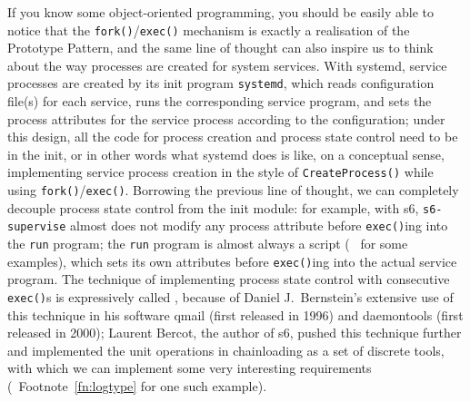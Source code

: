 If you know some object-oriented programming, you should be easily able to
notice that the \verb|fork()|/\verb|exec()| mechanism is exactly a realisation
of the Prototype Pattern, and the same line of thought can also inspire us
to think about the way processes are created for system services.  With systemd,
service processes are created by its init program \verb|systemd|, which reads
configuration file(s) for each service, runs the corresponding service program,
and sets the process attributes for the service process according to the
configuration; under this design, all the code for process creation and process
state control need to be in the init, or in other words what systemd does is
like, on a conceptual sense, implementing service process creation in the style
of \verb|CreateProcess()| while using \verb|fork()|/\verb|exec()|.  Borrowing
the previous line of thought, we can completely decouple process state control
from the init module: for example, with s6, \verb|s6-supervise| almost does
not modify any process attribute before \verb|exec()|ing into the \verb|run|
program; the \verb|run| program is almost always a script (\cf~\parencite%
{pollard2014} for some examples), which sets its own attributes before
\verb|exec()|ing into the actual service program.  The technique of implementing
process state control with consecutive \verb|exec()|s is expressively called
, because of Daniel J.\ Bernstein's extensive use
of this technique in his software qmail (first released in 1996) and daemontools
(first released in 2000); Laurent Bercot, the author of s6, pushed this
technique further and implemented the unit operations in chainloading as a set
of discrete tools, with which we can implement some very
interesting requirements (\cf~Footnote~\ref{fn:logtype} for one such example).

